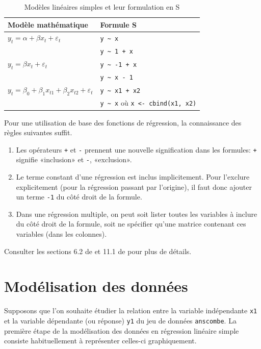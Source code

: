 \documentclass[letterpaper,10pt]{memoir}\usepackage[]{graphicx}\usepackage[]{color}
\makeatletter
\newcommand{\code}[1]{\texttt{#1}}
\newcommand{\indexfonction}[1]{\index{#1@\code{#1}}}
\newcommand{\fonction}[1]{\code{#1}\indexfonction{#1}}
\makeatother
\begin{document}
\begin{table}
  \centering
  \begin{tabular}{ll}
    \toprule
    \textbf{Modèle mathématique} & \textbf{Formule S} \\
    \midrule
    $y_t = \alpha + \beta x_t + \varepsilon_t$
      & \verb=y ~ x= \\
      & \verb=y ~ 1 + x= \\
    \midrule
    $y_t = \beta x_t + \varepsilon_t$
      & \verb=y ~ -1 + x= \\
      & \verb=y ~ x - 1= \\
    \midrule
    $y_t = \beta_0 + \beta_1 x_{t1} + \beta_2 x_{t2} + \varepsilon_t$
      & \verb=y ~ x1 + x2= \\
      & \verb=y ~ x= où \verb=x <- cbind(x1, x2)= \\
    \bottomrule
  \end{tabular}
  \caption{Modèles linéaires simples et leur formulation en S}
  \label{tab:formules}
\end{table}

Pour une utilisation de base des fonctions de régression, la
connaissance des règles suivantes suffit.
\begin{enumerate}
\item Les opérateurs \code{+} et \code{-} prennent une nouvelle
  signification dans les formules: \fonction{+} signifie «inclusion»
  et \fonction{-}, «exclusion».
\item Le terme constant d'une régression est inclus implicitement.
  Pour l'exclure explicitement (pour la régression passant par
  l'origine), il faut donc ajouter un terme \code{-1} du côté droit de
  la formule.
\item Dans une régression multiple, on peut soit lister toutes les
  variables à inclure du côté droit de la formule, soit ne spécifier
  qu'une matrice contenant ces variables (dans les colonnes).
\end{enumerate}

Consulter les sections 6.2 de \citet{MASS} et 11.1 de
{\shorthandoff{:} \citet{R:intro}} pour plus de détails.


\section{Modélisation des données}
\label{chap:regression:modelisation}

Supposons que l'on souhaite étudier la relation entre la variable
indépendante \code{x1} et la variable dépendante (ou réponse)
\code{y1} du jeu de données \texttt{anscombe}. La première étape de la
modélisation des données en régression linéaire simple consiste
habituellement à représenter celles-ci graphiquement.
\end{document}
